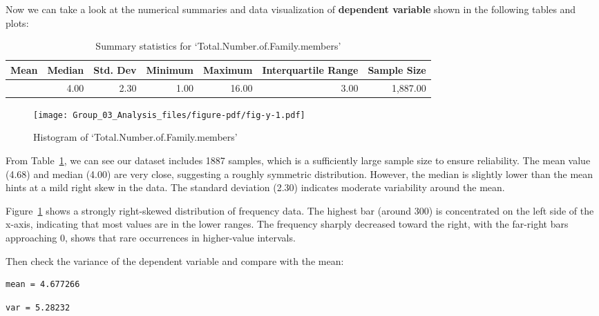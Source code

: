 \documentclass[
]{article}
\begin{document}
Now we can take a look at the numerical summaries and data visualization
of \textbf{dependent variable} shown in the following tables and plots:

\hypertarget{tbl-y}{}
\begin{table}
\caption{\label{tbl-y}Summary statistics for `Total.Number.of.Family.members' }\tabularnewline

\fontsize{12.0pt}{14.4pt}\selectfont
\begin{tabular*}{\linewidth}{@{\extracolsep{\fill}}rrrrrrr}
\toprule
Mean & Median & Std. Dev & Minimum & Maximum & Interquartile Range & Sample Size \\ 
\midrule\addlinespace[2.5pt]
4.68 & 4.00 & 2.30 & 1.00 & 16.00 & 3.00 & 1,887.00 \\ 
\bottomrule
\end{tabular*}
\end{table}

\begin{figure}[H]

{\centering \texttt{[image: Group\_03\_Analysis\_files/figure-pdf/fig-y-1.pdf]}

}

\caption{\label{fig-y}Histogram of `Total.Number.of.Family.members'}

\end{figure}

From Table~\ref{tbl-y}, we can see our dataset includes 1887 samples,
which is a sufficiently large sample size to ensure reliability. The
mean value (4.68) and median (4.00) are very close, suggesting a roughly
symmetric distribution. However, the median is slightly lower than the
mean hints at a mild right skew in the data. The standard deviation
(2.30) indicates moderate variability around the mean.

Figure~\ref{fig-y} shows a strongly right-skewed distribution of
frequency data. The highest bar (around 300) is concentrated on the left
side of the x-axis, indicating that most values are in the lower ranges.
The frequency sharply decreased toward the right, with the far-right
bars approaching 0, shows that rare occurrences in higher-value
intervals.

Then check the variance of the dependent variable and compare with the
mean:

\begin{verbatim}
mean = 4.677266 
\end{verbatim}

\begin{verbatim}
var = 5.28232 
\end{verbatim}
\end{document}
